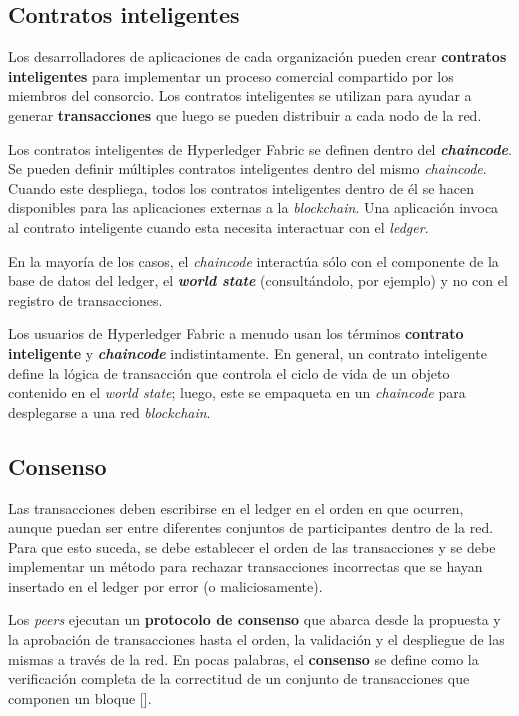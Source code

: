 \subsection*{Contratos inteligentes}

Los desarrolladores de aplicaciones de cada organización pueden crear \textbf{contratos inteligentes }para implementar un proceso comercial compartido por los miembros del consorcio. Los contratos inteligentes se utilizan para ayudar a generar \textbf{transacciones} que luego se pueden distribuir a cada nodo de la red.

Los contratos inteligentes de Hyperledger Fabric se definen dentro del \textbf{\textit{chaincode}}. Se pueden definir múltiples contratos inteligentes dentro del mismo \textit{chaincode}. Cuando este despliega, todos los contratos inteligentes dentro de él se hacen disponibles para las aplicaciones externas a la \textit{blockchain}. Una aplicación  invoca al contrato inteligente cuando esta necesita interactuar con el \textit{ledger}. 

En la mayoría de los casos, el \textit{chaincode} interactúa sólo con el componente de la base de datos del ledger, el \textbf{\textit{world state}} (consultándolo, por ejemplo) y no con el registro de transacciones.

Los usuarios de Hyperledger Fabric a menudo usan los términos \textbf{contrato inteligente} y \textbf{\textit{chaincode}} indistintamente. En general, un contrato inteligente define la lógica de transacción que controla el ciclo de vida de un objeto contenido en el \textit{world state}; luego, este se empaqueta en un \textit{chaincode} para desplegarse a una red \textit{blockchain}.

\subsection*{Consenso}
Las transacciones deben escribirse en el ledger en el orden en que ocurren, aunque puedan ser entre diferentes conjuntos de participantes dentro de la red. Para que esto suceda, se debe establecer el orden de las transacciones y se debe implementar un método para rechazar transacciones incorrectas que se hayan insertado en el ledger por error (o maliciosamente).

Los \textit{peers} ejecutan un \textbf{protocolo de consenso} que abarca desde la propuesta y la aprobación de transacciones hasta el orden, la validación y el despliegue de las mismas a través de la red.
En pocas palabras, el \textbf{consenso} se define como la verificación completa de la correctitud de un conjunto de transacciones que componen un bloque [\cite{hlf-doc}].

